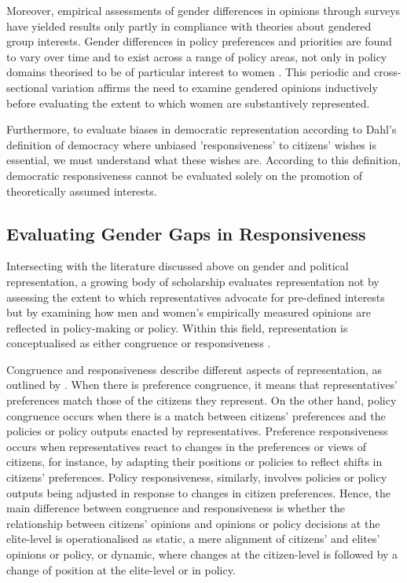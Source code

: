 Moreover, empirical assessments of gender differences in opinions through surveys have yielded results only partly in compliance with theories about gendered group interests. Gender differences in policy preferences and priorities are found to vary over time and to exist across a range of policy areas, not only in policy domains theorised to be of particular interest to women \parencite{yildirim_rethinking_2022, norris_gender_2003, rosset_how_2019, espirito-santo_gender_2022, gottlieb_men_2018}. This periodic and cross-sectional variation affirms the need to examine gendered opinions inductively before evaluating the extent to which women are substantively represented. 

Furthermore, to evaluate biases in democratic representation according to Dahl's definition of democracy \parencite*[2]{dahl_polyarchy_1971} where unbiased 'responsiveness' to citizens' wishes is essential, we must understand what these wishes are. According to this definition, democratic responsiveness cannot be evaluated solely on the promotion of theoretically assumed interests. 

\subsection*{Evaluating Gender Gaps in Responsiveness}
Intersecting with the literature discussed above on gender and political representation, a growing body of scholarship evaluates representation not by assessing the extent to which representatives advocate for pre-defined interests but by examining how men and women's empirically measured opinions are reflected in policy-making or policy. Within this field, representation is conceptualised as either congruence \parencite{homola_are_2019,dingler_parliaments_2019} or responsiveness \parencite{reher_gender_2018, persson_mans_2023, mathisen_influence_2024}.

Congruence and responsiveness describe different aspects of representation, as outlined by \textcite[343]{peters_democratic_2018}. When there is preference congruence, it means that representatives' preferences match those of the citizens they represent. On the other hand, policy congruence occurs when there is a match between citizens' preferences and the policies or policy outputs enacted by representatives. Preference responsiveness occurs when representatives react to changes in the preferences or views of citizens, for instance, by adapting their positions or policies to reflect shifts in citizens' preferences. Policy responsiveness, similarly, involves policies or policy outputs being adjusted in response to changes in citizen preferences. Hence, the main difference between congruence and responsiveness is whether the relationship between citizens' opinions and opinions or policy decisions at the elite-level is operationalised as static, a mere alignment of citizens' and elites' opinions or policy, or dynamic, where changes at the citizen-level is followed by a change of position at the elite-level or in policy. 

